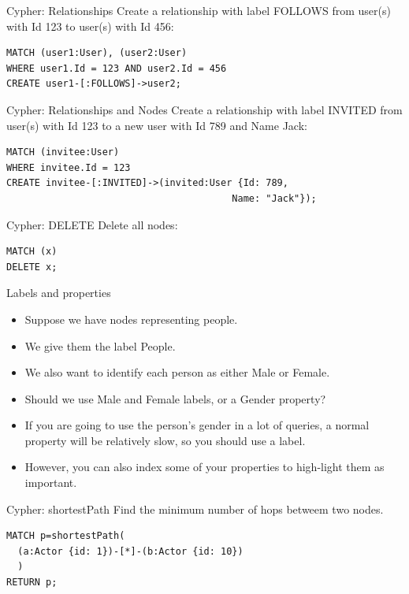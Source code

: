 \begin{frame}[fragile]{Cypher: Relationships}
  Create a relationship with label FOLLOWS from user(s) with Id 123 to user(s) with Id 456: 
  \begin{verbatim}
MATCH (user1:User), (user2:User)
WHERE user1.Id = 123 AND user2.Id = 456
CREATE user1-[:FOLLOWS]->user2;
  \end{verbatim}
\end{frame}

\begin{frame}[fragile]{Cypher: Relationships and Nodes}
  Create a relationship with label INVITED from user(s) with Id 123 to a new user with Id 789 and Name Jack: 
  \begin{verbatim}
MATCH (invitee:User)
WHERE invitee.Id = 123
CREATE invitee-[:INVITED]->(invited:User {Id: 789,
                                        Name: "Jack"});
  \end{verbatim}
\end{frame}


\begin{frame}[fragile]{Cypher: DELETE}
  Delete all nodes: 
  \begin{verbatim}
MATCH (x)
DELETE x;
  \end{verbatim}
\end{frame}

\begin{frame}{Labels and properties}
  \begin{itemize}
    \item Suppose we have nodes representing people.
    \item We give them the label People.
    \item We also want to identify each person as either Male or Female.
    \item Should we use Male and Female labels, or a Gender property?
    \item If you are going to use the person's gender in a lot of queries, a normal property will be relatively slow, so you should use a label.
    \item However, you can also index some of your properties to high-light them as important.
    
  \end{itemize}
\end{frame}

\begin{frame}[fragile]{Cypher: shortestPath}
  Find the minimum number of hops betweem two nodes.
  \begin{verbatim}
MATCH p=shortestPath(
  (a:Actor {id: 1})-[*]-(b:Actor {id: 10})
  )
RETURN p;
  \end{verbatim}
\end{frame}

